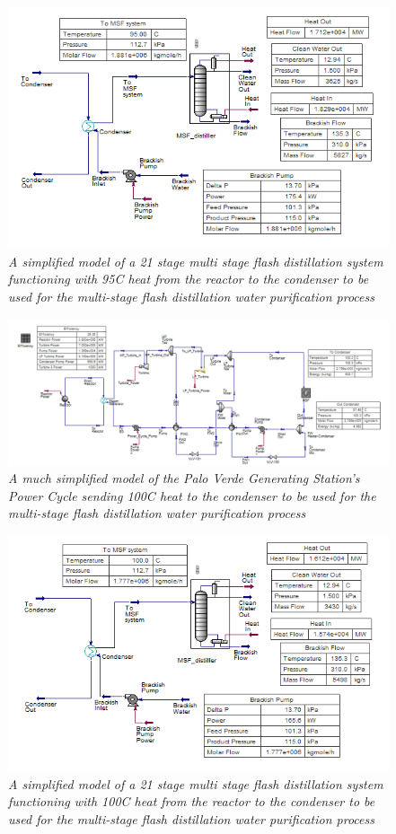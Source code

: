 \documentclass[12pt]{UIdahoMastersThesis}
\begin{document}
\begin{figure}
\includegraphics[width=\textwidth]{95MSF.PNG}
\caption{\small \sl A simplified model of a 21 stage multi stage flash distillation system functioning with 95\degree C heat from the reactor to the condenser to be used for the multi-stage flash distillation water purification process}
\end{figure}
\begin{figure}
\includegraphics[width=\textwidth]{100PC.PNG}
\caption{\small \sl A much simplified model of the Palo Verde Generating Station's Power Cycle sending 100\degree C heat to the condenser to be used for the multi-stage flash distillation water purification process}
\end{figure}
\begin{figure}
\includegraphics[width=\textwidth]{100MSF.PNG}
\caption{\small \sl A simplified model of a 21 stage multi stage flash distillation system functioning with 100\degree C heat from the reactor to the condenser to be used for the multi-stage flash distillation water purification process}
\end{figure}
\end{document}
